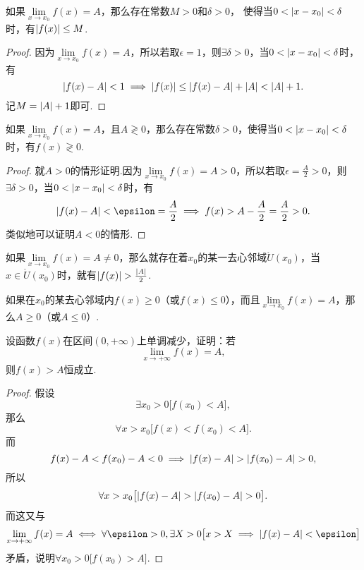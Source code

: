 \begin{theorem}[函数极限的局部有界性]\label{theorem:极限.函数极限的局部有界性}
如果\(\lim\limits_{x \to x_0}f(x) = A\)，那么存在常数\(M>0\)和\(\delta>0\)，
使得当\(0<\abs{x-x_0}<\delta\)时，有\(\abs{f(x)} \leq M\).
\begin{proof}
因为\(\lim\limits_{x \to x_0}f(x) = A\)，所以若取\(\epsilon = 1\)，则\(\exists \delta > 0\)，当\(0 < \abs{x - x_0} < \delta\)时，有\[
\abs{f(x) - A} < 1 \implies \abs{f(x)} \leq \abs{f(x) - A} + \abs{A} < \abs{A} + 1.
\]记\(M = \abs{A} + 1\)即可.
\end{proof}
\end{theorem}

\begin{theorem}[函数极限的局部保号性]\label{theorem:极限.函数极限的局部保号性1}
如果\(\lim\limits_{x \to x_0}f(x)=A\)，且\(A \gtrless 0\)，那么存在常数\(\delta>0\)，使得当\(0<\abs{x-x_0}<\delta\)时，有\(f(x) \gtrless 0\).
\begin{proof}
就\(A > 0\)的情形证明.因为\(\lim\limits_{x \to x_0}f(x) = A > 0\)，所以若取\(\epsilon = \frac{A}{2} > 0\)，则\(\exists \delta > 0\)，当\(0 < \abs{x - x_0} < \delta\)时，有\[
\abs{f(x) - A} < \epsilon = \frac{A}{2}
\implies f(x) > A - \frac{A}{2} = \frac{A}{2} > 0.
\]类似地可以证明\(A < 0\)的情形.
\end{proof}
\end{theorem}

\begin{theorem}\label{theorem:极限.函数极限的局部保号性2}
如果\(\lim\limits_{x \to x_0}f(x) = A \neq 0\)，那么就存在着\(x_0\)的某一去心邻域\(\mathring{U}(x_0)\)，当\(x\in\mathring{U}(x_0)\)时，就有\(\abs{f(x)}>\frac{\abs{A}}{2}\).
\end{theorem}

\begin{corollary}\label{theorem:极限.函数极限的局部保号性3}
如果在\(x_0\)的某去心邻域内\(f(x) \geq 0\)（或\(f(x) \leq 0\)），而且\(\lim\limits_{x \to x_0}f(x) = A\)，那么\(A \geq 0\)（或\(A \leq 0\)）.
\end{corollary}

\begin{example}
设函数\(f(x)\)在区间\((0,+\infty)\)上单调减少，证明：若\[
\lim\limits_{x\to+\infty}f(x)=A,
\]则\(f(x)>A\)恒成立.
\begin{proof}
假设\[
\exists x_0 > 0 \bigl[
	f(x_0) < A
\bigr],
\]那么\[
\forall x > x_0 \bigl[
	f(x) < f(x_0) < A
\bigr].
\]而\[
f(x) - A < f(x_0) - A < 0
\implies
\abs{f(x) - A} > \abs{f(x_0) - A} > 0,
\]所以\[
\forall x > x_0 \bigl[
	\abs{f(x) - A} > \abs{f(x_0) - A} > 0
\bigr].
\]而这又与\[
\lim\limits_{x\to+\infty}f(x)=A
\iff
\forall \epsilon > 0, \exists X > 0 \bigl[
	x > X \implies \abs{f(x) - A} < \epsilon
\bigr]
\]矛盾，说明\(\forall x_0 > 0 \bigl[
	f(x_0) > A
\bigr]\).
\end{proof}
\end{example}

